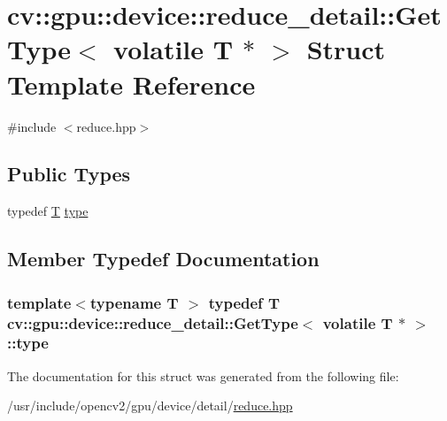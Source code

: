 \hypertarget{structcv_1_1gpu_1_1device_1_1reduce__detail_1_1GetType_3_01volatile_01T_01_5_01_4}{\section{cv\-:\-:gpu\-:\-:device\-:\-:reduce\-\_\-detail\-:\-:Get\-Type$<$ volatile T $\ast$ $>$ Struct Template Reference}
\label{structcv_1_1gpu_1_1device_1_1reduce__detail_1_1GetType_3_01volatile_01T_01_5_01_4}
}


{\ttfamily \#include $<$reduce.\-hpp$>$}

\subsection*{Public Types}
\begin{DoxyCompactItemize}
\item 
typedef \hyperlink{calib3d_8hpp_a3efb9551a871ddd0463079a808916717}{T} \hyperlink{structcv_1_1gpu_1_1device_1_1reduce__detail_1_1GetType_3_01volatile_01T_01_5_01_4_a58ebed105b1cc9bd1be312fc8ca11462}{type}
\end{DoxyCompactItemize}


\subsection{Member Typedef Documentation}
\hypertarget{structcv_1_1gpu_1_1device_1_1reduce__detail_1_1GetType_3_01volatile_01T_01_5_01_4_a58ebed105b1cc9bd1be312fc8ca11462}{
\subsubsection[{type}]{\setlength{\rightskip}{0pt plus 5cm}template$<$typename T $>$ typedef {\bf T} {\bf cv\-::gpu\-::device\-::reduce\-\_\-detail\-::\-Get\-Type}$<$ volatile {\bf T} $\ast$ $>$\-::{\bf type}}}\label{structcv_1_1gpu_1_1device_1_1reduce__detail_1_1GetType_3_01volatile_01T_01_5_01_4_a58ebed105b1cc9bd1be312fc8ca11462}


The documentation for this struct was generated from the following file\-:\begin{DoxyCompactItemize}
\item 
/usr/include/opencv2/gpu/device/detail/\hyperlink{detail_2reduce_8hpp}{reduce.\-hpp}\end{DoxyCompactItemize}
